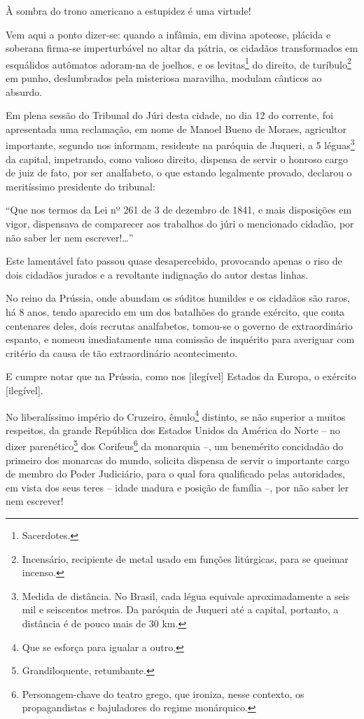 À sombra do trono americano a estupidez é uma virtude!

Vem aqui a ponto dizer-se: quando a infâmia, em divina apoteose, plácida
e soberana firma-se imperturbável no altar da pátria, os cidadãos
transformados em esquálidos autômatos adoram-na de joelhos, e os
levitas\footnote{Sacerdotes.} do direito, de turíbulo\footnote{
  Incensário, recipiente de metal usado em funções litúrgicas, para se
  queimar incenso.} em punho, deslumbrados pela misteriosa maravilha,
modulam cânticos ao absurdo.

Em plena sessão do Tribunal do Júri desta cidade, no dia 12 do corrente,
foi apresentada uma reclamação, em nome de Manoel Bueno de Moraes,
agricultor importante, segundo nos informam, residente na paróquia de
Juqueri, a 5 léguas\footnote{Medida de distância. No Brasil, cada
  légua equivale aproximadamente a seis mil e seiscentos metros. Da
  paróquia de Juqueri até a capital, portanto, a distância é de pouco
  mais de 30 km.} da capital, impetrando, como valioso direito, dispensa
de servir o honroso cargo de juiz de fato, por ser analfabeto, o que
estando legalmente provado, declarou o meritíssimo presidente do
tribunal:

``Que nos termos da Lei nº 261 de 3 de dezembro de 1841, e mais
disposições em vigor, dispensava de comparecer aos trabalhos do júri o
mencionado cidadão, por não saber ler nem escrever!\ldots''

Este lamentável fato passou quase desapercebido, provocando apenas o
riso de dois cidadãos jurados e a revoltante indignação do autor destas
linhas.

No reino da Prússia, onde abundam os súditos humildes e os cidadãos são
raros, há 8 anos, tendo aparecido em um dos batalhões do grande
exército, que conta centenares deles, dois recrutas analfabetos,
tomou-se o governo de extraordinário espanto, e nomeou imediatamente uma
comissão de inquérito para averiguar com critério da causa de tão
extraordinário acontecimento.

E cumpre notar que na Prússia, como nos {[}ilegível{]} Estados da
Europa, o exército {[}ilegível{]}.

No liberalíssimo império do Cruzeiro, êmulo\footnote{Que se esforça
  para igualar a outro.} distinto, se não superior a muitos respeitos,
da grande República dos Estados Unidos da América do Norte -- no dizer
parenético\footnote{Grandiloquente, retumbante.} dos
Corifeus\footnote{Personagem-chave do teatro grego, que ironiza, nesse
  contexto, os propagandistas e bajuladores do regime monárquico.} da
monarquia --, um benemérito concidadão do primeiro dos monarcas do
mundo, solicita dispensa de servir o importante cargo de membro do Poder
Judiciário, para o qual fora qualificado pelas autoridades, em vista dos
seus teres -- idade madura e posição de família --, por não saber ler
nem escrever!

